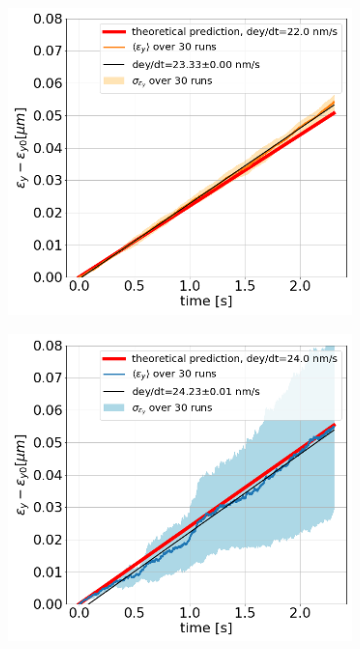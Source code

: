 \begin{figure}[htp]
    \centering
    \begin{subfigure}{.45\textwidth}
        \centering
        \includegraphics[width=.95\linewidth]{images/Ch6/study_1_AN_sixtracklib_kicks.png}  
    \end{subfigure}
    \begin{subfigure}{.45\textwidth}
        \centering
        \includegraphics[width=.95\linewidth]{images/Ch6/study_1_PN_sixtracklib_kicks.png}

\end{subfigure}
\end{figure}
